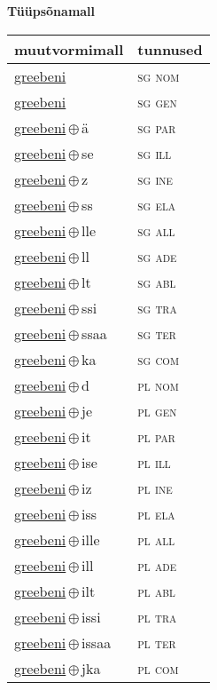 

\vspace{3.5em}
\noindent \begin{minipage}{\textwidth}
\noindent \textbf{Tüüpsõnamall \,}\\

\begin{sideways}
\begin{tabular}{l l}
muutvormimall & tunnused \\
\hline
\underline{greebeni} & \textsc{ sg nom } \\
\underline{greebeni} & \textsc{ sg gen } \\
\underline{greebeni}\,$\oplus$\,ä & \textsc{ sg par } \\
\underline{greebeni}\,$\oplus$\,se & \textsc{ sg ill } \\
\underline{greebeni}\,$\oplus$\,z & \textsc{ sg ine } \\
\underline{greebeni}\,$\oplus$\,ss & \textsc{ sg ela } \\
\underline{greebeni}\,$\oplus$\,lle & \textsc{ sg all } \\
\underline{greebeni}\,$\oplus$\,ll & \textsc{ sg ade } \\
\underline{greebeni}\,$\oplus$\,lt & \textsc{ sg abl } \\
\underline{greebeni}\,$\oplus$\,ssi & \textsc{ sg tra } \\
\underline{greebeni}\,$\oplus$\,ssaa & \textsc{ sg ter } \\
\underline{greebeni}\,$\oplus$\,ka & \textsc{ sg com } \\
\underline{greebeni}\,$\oplus$\,d & \textsc{ pl nom } \\
\underline{greebeni}\,$\oplus$\,je & \textsc{ pl gen } \\
\underline{greebeni}\,$\oplus$\,it & \textsc{ pl par } \\
\underline{greebeni}\,$\oplus$\,ise & \textsc{ pl ill } \\
\underline{greebeni}\,$\oplus$\,iz & \textsc{ pl ine } \\
\underline{greebeni}\,$\oplus$\,iss & \textsc{ pl ela } \\
\underline{greebeni}\,$\oplus$\,ille & \textsc{ pl all } \\
\underline{greebeni}\,$\oplus$\,ill & \textsc{ pl ade } \\
\underline{greebeni}\,$\oplus$\,ilt & \textsc{ pl abl } \\
\underline{greebeni}\,$\oplus$\,issi & \textsc{ pl tra } \\
\underline{greebeni}\,$\oplus$\,issaa & \textsc{ pl ter } \\
\underline{greebeni}\,$\oplus$\,jka & \textsc{ pl com } \\
\end{tabular}
\end{sideways}
\label{tab:tüüpsõnamall-greebeni}

\end{minipage}


